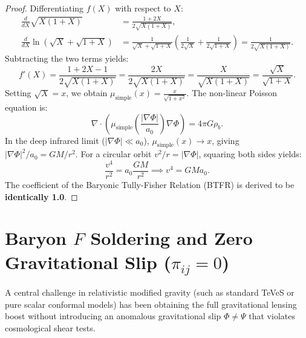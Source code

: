 \documentclass[11pt,a4paper]{article}
\theoremstyle{plain}
\theoremstyle{definition}
\theoremstyle{remark}
\begin{document}
\begin{proof}
Differentiating $f(X)$ with respect to $X$:
\begin{align}
\frac{d}{dX} \sqrt{X(1+X)} &= \frac{1 + 2X}{2\sqrt{X(1+X)}}, \\
\frac{d}{dX} \ln\left(\sqrt{X} + \sqrt{1+X}\right) &= \frac{1}{\sqrt{X} + \sqrt{1+X}} \left( \frac{1}{2\sqrt{X}} + \frac{1}{2\sqrt{1+X}} \right) = \frac{1}{2\sqrt{X(1+X)}}.
\end{align}
Subtracting the two terms yields:
\begin{equation}
f'(X) = \frac{1 + 2X - 1}{2\sqrt{X(1+X)}} = \frac{2X}{2\sqrt{X(1+X)}} = \frac{X}{\sqrt{X(1+X)}} = \frac{\sqrt{X}}{\sqrt{1+X}}.
\end{equation}
Setting $\sqrt{X} = x$, we obtain $\mu_{\text{simple}}(x) = \frac{x}{\sqrt{1+x^2}}$. The non-linear Poisson equation is:
\begin{equation}
\nabla \cdot \left( \mu_{\text{simple}}\left(\frac{|\nabla\Phi|}{a_0}\right) \nabla\Phi \right) = 4\pi G \rho_b.
\end{equation}
In the deep infrared limit ($|\nabla\Phi| \ll a_0$), $\mu_{\text{simple}}(x) \to x$, giving $|\nabla\Phi|^2 / a_0 = G M / r^2$. For a circular orbit $v^2 / r = |\nabla\Phi|$, squaring both sides yields:
\begin{equation}
\frac{v^4}{r^2} = a_0 \frac{G M}{r^2} \implies v^4 = G M a_0.
\end{equation}
The coefficient of the Baryonic Tully-Fisher Relation (BTFR) is derived to be \textbf{identically 1.0}.
\end{proof}

\section{Baryon $F$ Soldering and Zero Gravitational Slip ($\pi_{ij} = 0$)}

A central challenge in relativistic modified gravity (such as standard TeVeS or pure scalar conformal models) has been obtaining the full gravitational lensing boost without introducing an anomalous gravitational slip $\Phi \neq \Psi$ that violates cosmological shear tests.
\end{document}
